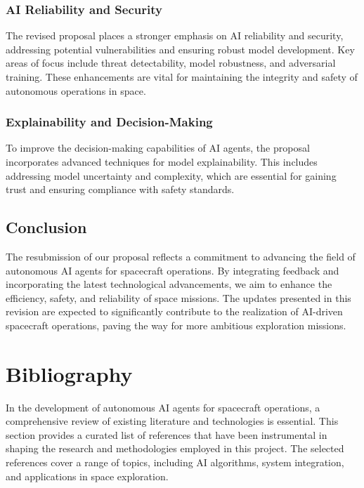 \documentclass[a4paper, 11pt]{article}
\begin{document}
\subsubsection{AI Reliability and Security}

The revised proposal places a stronger emphasis on AI reliability and security, addressing potential vulnerabilities and ensuring robust model development. Key areas of focus include threat detectability, model robustness, and adversarial training. These enhancements are vital for maintaining the integrity and safety of autonomous operations in space.

\subsubsection{Explainability and Decision-Making}

To improve the decision-making capabilities of AI agents, the proposal incorporates advanced techniques for model explainability. This includes addressing model uncertainty and complexity, which are essential for gaining trust and ensuring compliance with safety standards.

\subsection{Conclusion}

The resubmission of our proposal reflects a commitment to advancing the field of autonomous AI agents for spacecraft operations. By integrating feedback and incorporating the latest technological advancements, we aim to enhance the efficiency, safety, and reliability of space missions. The updates presented in this revision are expected to significantly contribute to the realization of AI-driven spacecraft operations, paving the way for more ambitious exploration missions.
\section{Bibliography}

In the development of autonomous AI agents for spacecraft operations, a comprehensive review of existing literature and technologies is essential. This section provides a curated list of references that have been instrumental in shaping the research and methodologies employed in this project. The selected references cover a range of topics, including AI algorithms, system integration, and applications in space exploration.
\end{document}
